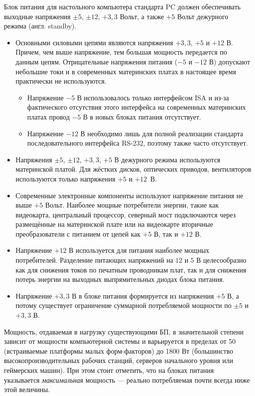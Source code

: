 Блок питания для настольного компьютера стандарта PC должен обеспечивать выходные напряжения $\pm 5$, $\pm 12$, $+3,3$ Вольт, а также $+5$ Вольт дежурного режима (англ. standby).
\begin{itemize}
 \item Основными силовыми цепями являются напряжения $+3,3$, $+5$ и $+12$ В. Причем, чем выше напряжение, тем большая мощность передается по данным цепям. Отрицательные напряжения питания ($−5$ и $−12$ В) допускают небольшие токи и в современных материнских платах в настоящее время практически не используются. 
 \begin{itemize}
  \item Напряжение $−5$ В использовалось только интерфейсом ISA и из-за фактического отсутствия этого интерфейса на современных материнских платах провод $−5$ В в новых блоках питания отсутствует.
  \item Напряжение $−12$ В необходимо лишь для полной реализации стандарта последовательного интерфейса RS-232, поэтому также часто отсутствует.
 \end{itemize}
 \item Напряжения $\pm 5$, $\pm 12$, $+3,3$, $+5$ В дежурного режима используются материнской платой. Для жёстких дисков, оптических приводов, вентиляторов используются только напряжения $+5$ и $+12$~В.
 \item Современные электронные компоненты используют напряжение питания не выше $+5$ Вольт. Наиболее мощные потребители энергии, такие как видеокарта, центральный процессор, северный мост подключаются через размещённые на материнской плате или на видеокарте вторичные преобразователи с питанием от цепей как $+5$ В, так и $+12$ В.
 \item Напряжение $+12$ В используется для питания наиболее мощных потребителей. Разделение питающих напряжений на $12$ и $5$ В целесообразно как для снижения токов по печатным проводникам плат, так и для снижения потерь энергии на выходных выпрямительных диодах блока питания.
 \item Напряжение $+3,3$ В в блоке питания формируется из напряжения $+5$ В, а потому существует ограничение суммарной потребляемой мощности по $\pm 5$ и $+3,3$ В.
\end{itemize}

Мощность, отдаваемая в нагрузку существующими БП, в значительной степени зависит от мощности компьютерной системы и варьируется в пределах от 50 (встраиваемые платформы малых форм-факторов) до 1800 Вт (большинство высокопроизводительных рабочих станций, серверов начального уровня или геймерских машин).
При этом стоит отметить, что на блоках питания указывается \emph{максимальная} мощность --- реально потребляемая почти всегда ниже этой величины.

